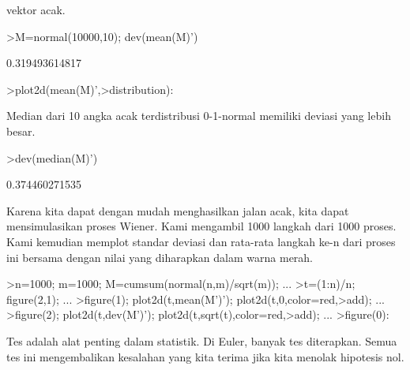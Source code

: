 \documentclass[a4paper,10pt]{article}
\begin{document}
\begin{eulernotebook}
\begin{eulercomment}
vektor acak.
\end{eulercomment}
\begin{eulerprompt}
>M=normal(10000,10); dev(mean(M)')
\end{eulerprompt}
\begin{euleroutput}
  0.319493614817
\end{euleroutput}
\begin{eulerprompt}
>plot2d(mean(M)',>distribution):
\end{eulerprompt}
\begin{eulercomment}
Median dari 10 angka acak terdistribusi 0-1-normal memiliki deviasi
yang lebih besar.
\end{eulercomment}
\begin{eulerprompt}
>dev(median(M)')
\end{eulerprompt}
\begin{euleroutput}
  0.374460271535
\end{euleroutput}
\begin{eulercomment}
Karena kita dapat dengan mudah menghasilkan jalan acak, kita dapat
mensimulasikan proses Wiener. Kami mengambil 1000 langkah dari 1000
proses. Kami kemudian memplot standar deviasi dan rata-rata langkah
ke-n dari proses ini bersama dengan nilai yang diharapkan dalam warna
merah.
\end{eulercomment}
\begin{eulerprompt}
>n=1000; m=1000; M=cumsum(normal(n,m)/sqrt(m)); ...
>t=(1:n)/n; figure(2,1); ...
>figure(1); plot2d(t,mean(M')'); plot2d(t,0,color=red,>add); ...
>figure(2); plot2d(t,dev(M')'); plot2d(t,sqrt(t),color=red,>add); ...
>figure(0):
\end{eulerprompt}
\begin{eulercomment}
Tes adalah alat penting dalam statistik. Di Euler, banyak tes
diterapkan. Semua tes ini mengembalikan kesalahan yang kita terima
jika kita menolak hipotesis nol.


\end{eulercomment}
\end{eulernotebook}
\end{document}
